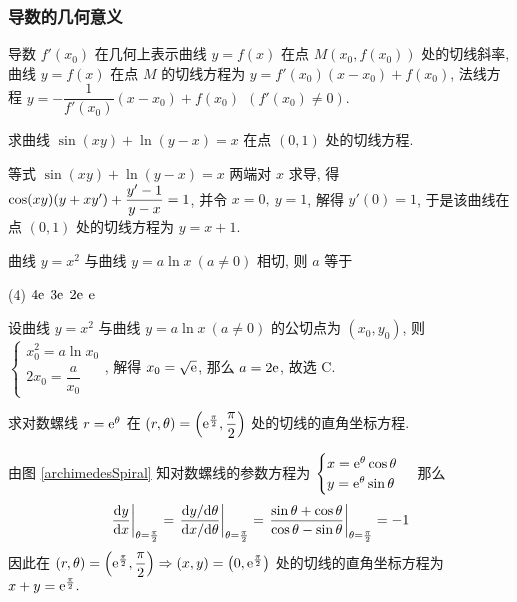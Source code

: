 \subsubsection{导数的几何意义}

导数 $f'(x_0)$ 在几何上表示曲线 $y=f(x)$ 在点 $M(x_0,f(x_0))$ 处的切线斜率, 曲线 $y=f(x)$ 在点 $M$ 的切线方程为 $y=f'(x_0)(x-x_0)+f(x_0)$, 法线方程 $y=-\dfrac{1}{f'(x_0)}(x-x_0)+f(x_0)~~(f'(x_0)\neq 0).$

\begin{example}[2008 数一]
    求曲线 $\sin(xy)+\ln(y-x)=x$ 在点 $(0,1)$ 处的切线方程.
\end{example}
\begin{solution}
    等式 $\sin(xy)+\ln(y-x)=x$ 两端对 $x$ 求导, 得 $\cos(xy)\qty(y+xy')+\dfrac{y'-1}{y-x}=1$, 并令 $x=0,~y=1$, 解得 $y'(0)=1$, 于是该曲线在点 $(0,1)$ 处的切线方程为 $y=x+1.$
\end{solution}

\begin{example}[2010 数二]
    曲线 $y=x^2$ 与曲线 $y=a\ln x~(a\neq 0)$ 相切, 则 $a$ 等于
    \begin{tasks}(4)
        \task $4\mathrm{e}$
        \task $3\mathrm{e}$
        \task $2\mathrm{e}$
        \task $\mathrm{e}$
    \end{tasks}
\end{example}
\begin{solution}
    设曲线 $y=x^2$ 与曲线 $y=a\ln x~(a\neq 0)$ 的公切点为 $(x_0,y_0)$, 则 $\begin{cases}
            x_0^2=a\ln x_0 \\2x_0=\dfrac{a}{x_0}
        \end{cases}$, 解得 $x_0=\sqrt{\mathrm{e}}$, 那么 $a=2\mathrm{e}$, 故选 C.
\end{solution}

\begin{example}
    求对数螺线 $r=\mathrm{e}^\theta$ 在 $(r,\theta)=\qty(\mathrm{e} ^{\frac{\pi}{2}},\dfrac{\pi}{2})$ 处的切线的直角坐标方程.
\end{example}
\begin{solution}
    由图 \ref{archimedesSpiral} 知对数螺线的参数方程为 $\begin{cases}
        x=\mathrm{e}^\theta\cos\theta\\y=\mathrm{e}^\theta\sin\theta
    \end{cases}$ 那么 
    $$\eval{\dv{y}{x}}_{\theta=\frac{\pi}{2}}=\eval{\dfrac{\dd y/\dd \theta}{\dd x/\dd \theta}}_{\theta=\frac{\pi}{2}}=\eval{\dfrac{\sin\theta+\cos\theta}{\cos\theta-\sin\theta}}_{\theta=\frac{\pi}{2}}=-1$$
    因此在 $(r,\theta)=\qty(\mathrm{e} ^{\frac{\pi}{2}},\dfrac{\pi}{2})\Rightarrow (x,y)=\qty(0,\mathrm{e} ^{\frac{\pi}{2}})$ 处的切线的直角坐标方程为 $x+y=\mathrm{e} ^{\frac{\pi}{2}}.$
\end{solution}


